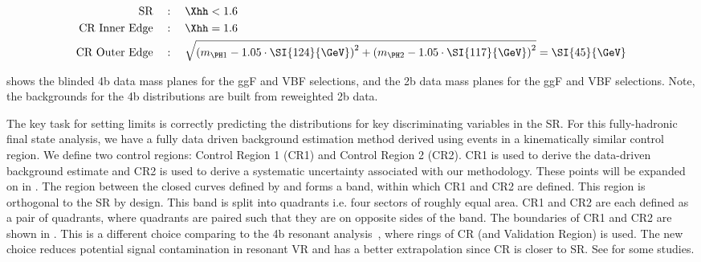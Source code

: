 \begin{align}
	\text{SR} \quad &: \quad \Xhh < 1.6 \label{eq:sr} \\ 
	\text{CR\ Inner\ Edge} \quad &: \quad \Xhh = 1.6 \label{eq:cr_in} \\
	\text{CR\ Outer\ Edge} \quad &: \quad \sqrt{ \left(m_{\PH1} - 1.05 \cdot \SI{124}{\GeV}\right)^2 +  \left(m_{\PH2} - 1.05 \cdot \SI{117}{\GeV}\right)^2 } = \SI{45}{\GeV}  \label{eq:cr_out}
\end{align}

\Fig{\ref{fig:massplanes-allYrs-data}} shows the blinded 4b data mass planes for the ggF and VBF selections, and the 2b data mass planes for the ggF and VBF selections. Note, the backgrounds for the 4b distributions are built from reweighted 2b data.

The key task for setting limits is correctly predicting the distributions for key discriminating variables in the SR. 
For this fully-hadronic final state analysis, we have a fully data driven background estimation method derived using events in a kinematically similar control region.
We define two control regions: Control Region 1 (CR1) and Control Region 2 (CR2). 
CR1 is used to derive the data-driven background estimate and CR2 is used to derive a systematic uncertainty associated with our methodology. 
These points will be expanded on in \Sect{\ref{sec:bkgdestimation}}. 
The region between the closed curves defined by \Eqn{\ref{eq:cr_in}} and \Eqn{\ref{eq:cr_out}} forms a band, within which CR1 and CR2 are defined. This region is orthogonal to the SR by design. This band is split into quadrants i.e. four sectors of roughly equal area. CR1 and CR2 are each defined as a pair of quadrants, where quadrants are paired such that they are on opposite sides of the band. The boundaries of CR1 and CR2 are shown in \Fig{\ref{fig:massplanes-allYrs-data}}.
This is a different choice comparing to the 4b resonant analysis~\cite{bbbbresolvedNote}, where rings of CR (and Validation Region) is used.
The new choice reduces potential signal contamination in resonant VR and has a better extrapolation since CR is closer to SR.
See \App{\ref{train-with-sig-inject}} for some studies.

